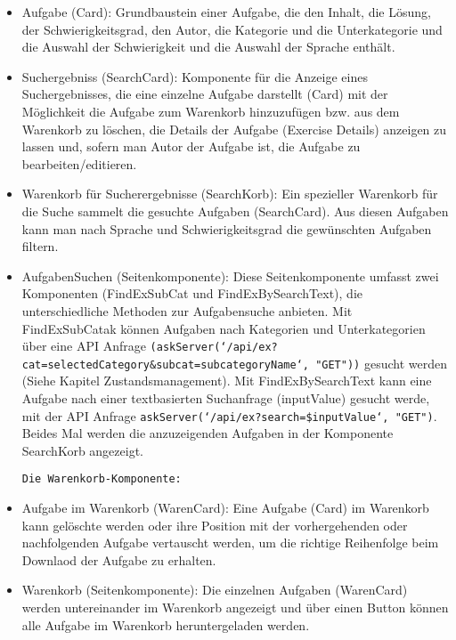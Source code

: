 \begin{itemize}

\item Aufgabe (Card):
Grundbaustein einer Aufgabe, die den Inhalt, die Lösung, der Schwierigkeitsgrad, den Autor, die Kategorie und die Unterkategorie und die Auswahl der Schwierigkeit und die Auswahl der Sprache enthält.

\item Suchergebniss (SearchCard):
Komponente für die Anzeige eines Suchergebnisses, die eine einzelne Aufgabe darstellt (Card) mit der Möglichkeit die Aufgabe zum Warenkorb hinzuzufügen bzw. aus dem Warenkorb zu löschen, die Details der Aufgabe (Exercise Details) anzeigen zu lassen und, sofern man Autor der Aufgabe ist, die Aufgabe zu bearbeiten/editieren.

\item Warenkorb für Sucherergebnisse (SearchKorb):
Ein spezieller Warenkorb für die Suche sammelt die gesuchte Aufgaben (SearchCard).
Aus diesen Aufgaben kann man nach Sprache und Schwierigkeitsgrad die gewünschten Aufgaben filtern.

\item AufgabenSuchen (Seitenkomponente):
Diese Seitenkomponente umfasst zwei Komponenten (FindExSubCat und FindExBySearchText), die unterschiedliche Methoden zur Aufgabensuche anbieten. Mit FindExSubCatak können Aufgaben nach Kategorien und Unterkategorien über eine API Anfrage \texttt{(askServer(`/api/ex?cat={selectedCategory}\&subcat={subcategoryName}`, "GET"))} gesucht werden (Siehe Kapitel Zustandsmanagement).
Mit FindExBySearchText kann eine Aufgabe nach einer textbasierten Suchanfrage (inputValue) gesucht werde, mit der API Anfrage \texttt{askServer(`/api/ex?search=\${inputValue}`, "GET")}.
Beides Mal werden die anzuzeigenden Aufgaben in der Komponente SearchKorb angezeigt.


\texttt{Die Warenkorb-Komponente:}


\item Aufgabe im Warenkorb (WarenCard):
Eine Aufgabe (Card) im Warenkorb kann gelöschte werden oder ihre Position mit der vorhergehenden oder nachfolgenden Aufgabe vertauscht werden, um die richtige Reihenfolge beim Downlaod der Aufgabe zu erhalten. 


\item Warenkorb (Seitenkomponente):
Die einzelnen Aufgaben (WarenCard) werden untereinander im Warenkorb angezeigt und über einen Button können alle Aufgabe im Warenkorb heruntergeladen werden.



\end{itemize}

